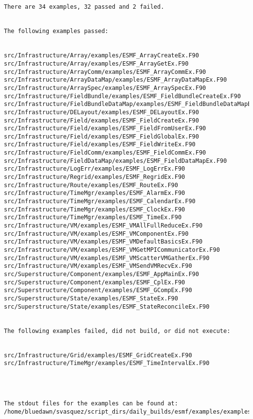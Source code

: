 \begin{verbatim}


There are 34 examples, 32 passed and 2 failed.


The following examples passed:


src/Infrastructure/Array/examples/ESMF_ArrayCreateEx.F90
src/Infrastructure/Array/examples/ESMF_ArrayGetEx.F90
src/Infrastructure/ArrayComm/examples/ESMF_ArrayCommEx.F90
src/Infrastructure/ArrayDataMap/examples/ESMF_ArrayDataMapEx.F90
src/Infrastructure/ArraySpec/examples/ESMF_ArraySpecEx.F90
src/Infrastructure/FieldBundle/examples/ESMF_FieldBundleCreateEx.F90
src/Infrastructure/FieldBundleDataMap/examples/ESMF_FieldBundleDataMapEx.F90
src/Infrastructure/DELayout/examples/ESMF_DELayoutEx.F90
src/Infrastructure/Field/examples/ESMF_FieldCreateEx.F90
src/Infrastructure/Field/examples/ESMF_FieldFromUserEx.F90
src/Infrastructure/Field/examples/ESMF_FieldGlobalEx.F90
src/Infrastructure/Field/examples/ESMF_FieldWriteEx.F90
src/Infrastructure/FieldComm/examples/ESMF_FieldCommEx.F90
src/Infrastructure/FieldDataMap/examples/ESMF_FieldDataMapEx.F90
src/Infrastructure/LogErr/examples/ESMF_LogErrEx.F90
src/Infrastructure/Regrid/examples/ESMF_RegridEx.F90
src/Infrastructure/Route/examples/ESMF_RouteEx.F90
src/Infrastructure/TimeMgr/examples/ESMF_AlarmEx.F90
src/Infrastructure/TimeMgr/examples/ESMF_CalendarEx.F90
src/Infrastructure/TimeMgr/examples/ESMF_ClockEx.F90
src/Infrastructure/TimeMgr/examples/ESMF_TimeEx.F90
src/Infrastructure/VM/examples/ESMF_VMAllFullReduceEx.F90
src/Infrastructure/VM/examples/ESMF_VMComponentEx.F90
src/Infrastructure/VM/examples/ESMF_VMDefaultBasicsEx.F90
src/Infrastructure/VM/examples/ESMF_VMGetMPICommunicatorEx.F90
src/Infrastructure/VM/examples/ESMF_VMScatterVMGatherEx.F90
src/Infrastructure/VM/examples/ESMF_VMSendVMRecvEx.F90
src/Superstructure/Component/examples/ESMF_AppMainEx.F90
src/Superstructure/Component/examples/ESMF_CplEx.F90
src/Superstructure/Component/examples/ESMF_GCompEx.F90
src/Superstructure/State/examples/ESMF_StateEx.F90
src/Superstructure/State/examples/ESMF_StateReconcileEx.F90


The following examples failed, did not build, or did not execute:


src/Infrastructure/Grid/examples/ESMF_GridCreateEx.F90
src/Infrastructure/TimeMgr/examples/ESMF_TimeIntervalEx.F90




The stdout files for the examples can be found at:
/home/bluedawn/svasquez/script_dirs/daily_builds/esmf/examples/examplesO/AIX.default.64.default

\end{verbatim}

